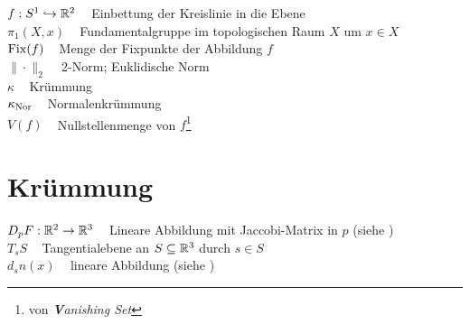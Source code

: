 $f:S^1 \hookrightarrow \mathbb{R}^2\;\;\;$ Einbettung der Kreislinie in die Ebene\\
$\pi_1(X,x)\;\;\;$ Fundamentalgruppe im topologischen Raum $X$ um $x \in X$\\
$\operatorname{Fix}(f)\;\;\;$ Menge der Fixpunkte der Abbildung $f$\\
$\|\cdot\|_2\;\;\;$ 2-Norm; Euklidische Norm\\
$\kappa\;\;\;$ Krümmung\\
$\kappa_{\textnormal{Nor}}\;\;\;$ Normalenkrümmung\\
$V(f)\;\;\;$ Nullstellenmenge von $f$\footnote{von \textit{\textbf{V}anishing Set}}

\section*{Krümmung}
$D_p F: \mathbb{R}^2 \rightarrow \mathbb{R}^3\;\;\;$ Lineare Abbildung mit Jaccobi-Matrix in $p$ (siehe )\\
$T_s S\;\;\;$ Tangentialebene an $S \subseteq \mathbb{R}^3$ durch $s \in S$\\
$d_s n(x)\;\;\;$ lineare Abbildung (siehe )\\

